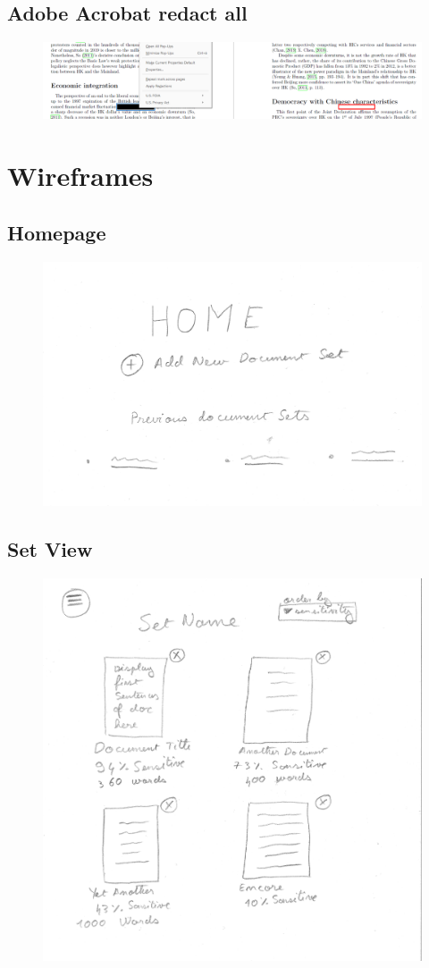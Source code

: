 \documentclass[\version]{l4proj}
\begin{document}
\begin{appendices}
    \section{Adobe Acrobat redact all}\label{fig:adobe-redact-all}
    \begin{figure}[H]
        \centering
        \includegraphics[width=\linewidth]{images/related_products/adobe_redact_all.png}
    \end{figure}
    \chapter{Wireframes}
    \section{Homepage}\label{fig:home-wireframe}
    \begin{figure}[H]
        \centering
        \includegraphics[width=0.7\linewidth]{images/wireframes/home.jpg}
    \end{figure}
    \section{Set View}\label{fig:set-view-wireframe}
    \begin{figure}[H]
        \centering
        \includegraphics[width=0.65\linewidth]{images/wireframes/set.jpg}
    \end{figure}

\end{appendices}
\end{document}

